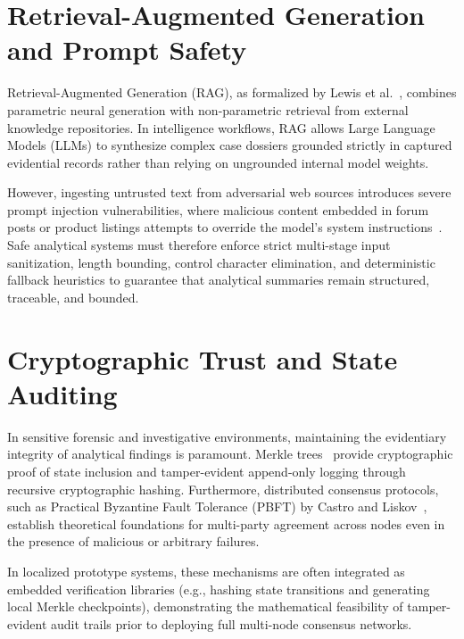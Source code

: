\section{Retrieval-Augmented Generation and Prompt Safety}
\label{sec:related-rag-safety}
Retrieval-Augmented Generation (RAG), as formalized by Lewis et al.~\cite{lewis2020retrieval}, combines parametric neural generation with non-parametric retrieval from external knowledge repositories. In intelligence workflows, RAG allows Large Language Models (LLMs) to synthesize complex case dossiers grounded strictly in captured evidential records rather than relying on ungrounded internal model weights.

However, ingesting untrusted text from adversarial web sources introduces severe prompt injection vulnerabilities, where malicious content embedded in forum posts or product listings attempts to override the model's system instructions~\cite{perez2022ignore}. Safe analytical systems must therefore enforce strict multi-stage input sanitization, length bounding, control character elimination, and deterministic fallback heuristics to guarantee that analytical summaries remain structured, traceable, and bounded.

\section{Cryptographic Trust and State Auditing}
\label{sec:related-cryptographic-trust}
In sensitive forensic and investigative environments, maintaining the evidentiary integrity of analytical findings is paramount. Merkle trees~\cite{merkle1987digital} provide cryptographic proof of state inclusion and tamper-evident append-only logging through recursive cryptographic hashing. Furthermore, distributed consensus protocols, such as Practical Byzantine Fault Tolerance (PBFT) by Castro and Liskov~\cite{castro2002practical}, establish theoretical foundations for multi-party agreement across nodes even in the presence of malicious or arbitrary failures.

In localized prototype systems, these mechanisms are often integrated as embedded verification libraries (e.g., hashing state transitions and generating local Merkle checkpoints), demonstrating the mathematical feasibility of tamper-evident audit trails prior to deploying full multi-node consensus networks.

